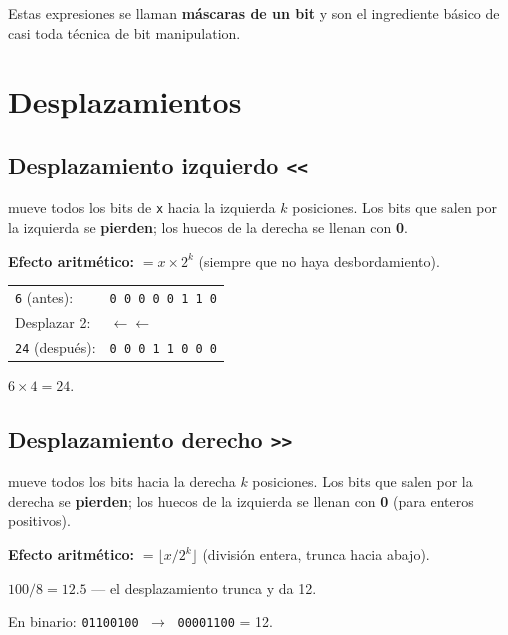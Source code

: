 \documentclass[12pt, oneside]{article}
\begin{document}
Estas expresiones se llaman \textbf{máscaras de un bit} y son el ingrediente
básico de casi toda técnica de bit manipulation.

\section{Desplazamientos}

\subsection{Desplazamiento izquierdo \texttt{<<}}

 mueve todos los bits de \texttt{x} hacia la izquierda $k$
posiciones. Los bits que salen por la izquierda se \textbf{pierden}; los
huecos de la derecha se llenan con \textbf{0}.

\medskip
\textbf{Efecto aritmético:}  $= x \times 2^k$
(siempre que no haya desbordamiento).

\begin{ejemplo}[\texttt{6 << 2 = 24}]
\begin{center}
\begin{tabular}{ll}
  \texttt{6} (antes):  & \texttt{0 0 0 0 0 1 1 0} \\
  Desplazar 2:         & $\leftarrow\leftarrow$ \\
  \texttt{24} (después): & \texttt{0 0 0 1 1 0 0 0} \\
\end{tabular}
\end{center}
$6 \times 4 = 24$. \checkmark
\end{ejemplo}

\subsection{Desplazamiento derecho \texttt{>>}}

 mueve todos los bits hacia la derecha $k$ posiciones.
Los bits que salen por la derecha se \textbf{pierden}; los huecos de la
izquierda se llenan con \textbf{0} (para enteros positivos).

\medskip
\textbf{Efecto aritmético:}  $= \lfloor x / 2^k \rfloor$
(división entera, trunca hacia abajo).

\begin{ejemplo}[\texttt{100 >> 3 = 12}]
$100 / 8 = 12.5$ — el desplazamiento trunca y da 12.

En binario: \texttt{01100100} $\;\to\;$ \texttt{00001100} = 12. \checkmark
\end{ejemplo}
\end{document}
